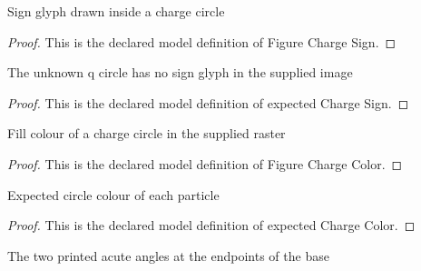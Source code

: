 \begin{definition}
  \label{def:physics:phyx-mini-0907:phyxminiproblems-problemphyxmini0907-figurechargesign}
  Sign glyph drawn inside a charge circle
\end{definition}
\begin{proof}
  This is the declared model definition of Figure Charge Sign.
\end{proof}
\begin{definition}
  \label{def:physics:phyx-mini-0907:phyxminiproblems-problemphyxmini0907-expectedchargesign}
  The unknown q circle has no sign glyph in the supplied image
\end{definition}
\begin{proof}
  This is the declared model definition of expected Charge Sign.
\end{proof}
\begin{definition}
  \label{def:physics:phyx-mini-0907:phyxminiproblems-problemphyxmini0907-figurechargecolor}
  Fill colour of a charge circle in the supplied raster
\end{definition}
\begin{proof}
  This is the declared model definition of Figure Charge Color.
\end{proof}
\begin{definition}
  \label{def:physics:phyx-mini-0907:phyxminiproblems-problemphyxmini0907-expectedchargecolor}
  Expected circle colour of each particle
\end{definition}
\begin{proof}
  This is the declared model definition of expected Charge Color.
\end{proof}
\begin{definition}
  \label{def:physics:phyx-mini-0907:phyxminiproblems-problemphyxmini0907-basevertex}
  The two printed acute angles at the endpoints of the base
\end{definition}
